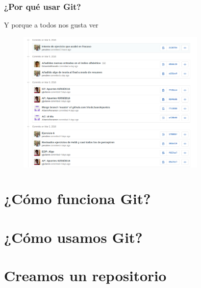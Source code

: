 \documentclass[10pt,compress,usetitleprogressbar,aspectratio=1610,mathserif,notes]{beamer}
\begin{document}
\begin{frame}
\frametitle{¿Por qué usar Git?}

Y porque a todos nos gusta ver
\begin{figure}[b]
\centering
\includegraphics[height = 200pt]{gitCommits.png}
\end{figure}
\end{frame}

\section{¿Cómo funciona Git?}


\section{¿Cómo usamos Git?}


\section{Creamos un repositorio}
\end{document}
